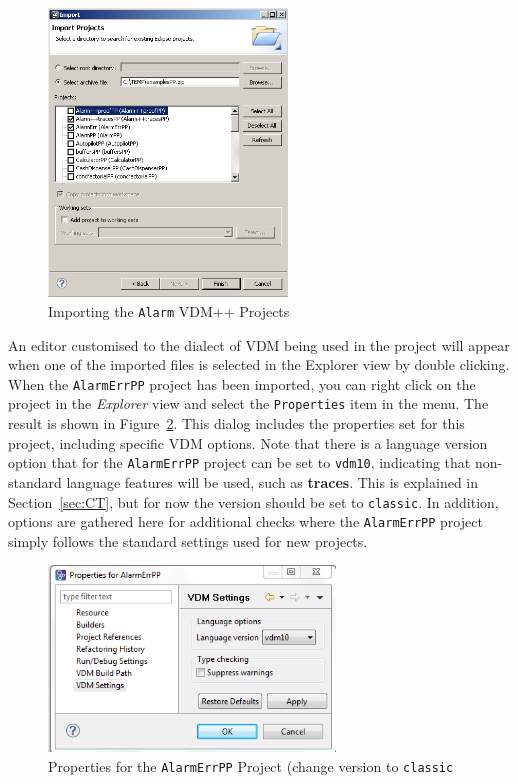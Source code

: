 \begin{figure}[!htb]
\begin{center}
  \includegraphics[width=2.5in]{figures/importalarmprofs}
  \caption[labelInTOC]{Importing the \texttt{Alarm} VDM++ Projects}
  \label{fig:importalarm}
\end{center}
\end{figure}
%
An editor customised to the dialect of VDM being used in the project will appear when one of the imported files is selected in the Explorer view by double clicking. When the
\texttt{AlarmErrPP} project has been imported, you can right click on the project in the \emph{Explorer} view and select the \texttt{Properties} item in the menu.  The result is shown in Figure~\ref{fig:settings}. This dialog includes the properties set for this project, including specific VDM options. Note that there is a language version option that for the \texttt{AlarmErrPP} project can be set to \texttt{vdm10}, indicating that non-standard language features will be used, such as {\bf\ttfamily traces}.  This is explained in Section~\ref{sec:CT}, but for now the version should be set to \texttt{classic}. In addition, options are gathered here for additional checks where the \texttt{AlarmErrPP} project simply follows the standard settings used for new projects.
%
\begin{figure}[!htb]
\begin{center}
  \includegraphics[width=3.0in]{figures/settings}
  \caption[labelInTOC]{Properties for the \texttt{AlarmErrPP} Project (change version to \texttt{classic}}
  \label{fig:settings}
\end{center}
\end{figure}

